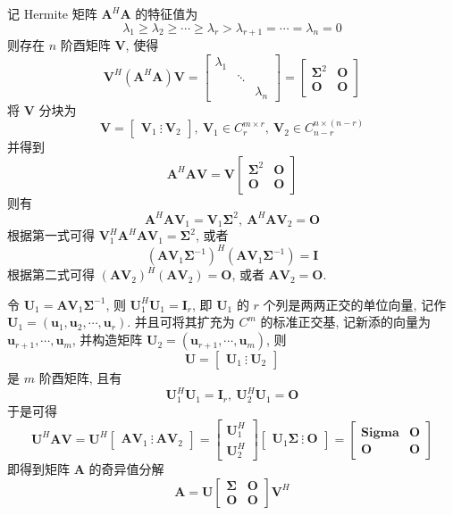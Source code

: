 \par 记 Hermite 矩阵 $\bm{A}^H\bm{A}$ 的特征值为
$$
    \lambda_1 \geqslant \lambda_2 \geqslant \cdots \geqslant \lambda_r > \lambda_{r + 1} = \cdots = \lambda_n = 0
$$
则存在 $n$ 阶酉矩阵 $\bm{V}$, 使得
$$
    \bm{V}^H(\bm{A}^H\bm{A})\bm{V} = \begin{bmatrix}
        \lambda_1 &        &           \\
                  & \ddots &           \\
                  &        & \lambda_n
    \end{bmatrix} = \begin{bmatrix}
        \bm{\Sigma}^2 & \bm{O} \\
        \bm{O}        & \bm{O}
    \end{bmatrix}
$$
将 $\bm{V}$ 分块为
$$
    \bm{V} = \begin{bmatrix}
        \bm{V}_1 \ \vdots \ \bm{V}_2
    \end{bmatrix},\ \bm{V}_1 \in C^{m\times r}_r,\ \bm{V}_2 \in C^{n\times(n - r)}_{n-r}
$$
并得到
$$
    \bm{A}^H\bm{AV} = \bm{V}\begin{bmatrix}
        \bm{\Sigma}^2 & \bm{O} \\
        \bm{O}        & \bm{O}
    \end{bmatrix}
$$
则有
$$
    \bm{A}^H\bm{AV}_1 = \bm{V}_1\bm{\Sigma}^2,\ \bm{A}^H\bm{AV}_2 = \bm{O}
$$
根据第一式可得 $\bm{V}_1^H\bm{A}^H\bm{AV}_1 = \bm{\Sigma}^2$, 或者
$$
    (\bm{AV}_1\bm{\Sigma}^{-1})^H(\bm{AV}_1\bm{\Sigma}^{-1}) = \bm{I}
$$
根据第二式可得 $(\bm{AV}_2)^H(\bm{AV}_2) = \bm{O}$, 或者 $\bm{AV}_2 = \bm{O}$.
\par 令 $\bm{U}_1 = \bm{AV}_1\bm{\Sigma}^{-1}$, 则 $\bm{U}_1^H\bm{U}_1 = \bm{I}_r$, 即 $\bm{U}_1$ 的 $r$ 个列是两两正交的单位向量, 记作
$\bm{U}_1 = (\bm{u}_1, \bm{u}_2, \cdots, \bm{u}_r)$. 并且可将其扩充为 $C^m$ 的标准正交基, 记新添的向量为 $\bm{u}_{r + 1}, \cdots, \bm{u}_m$,
并构造矩阵 $\bm{U}_2 = (\bm{u}_{r + 1}, \cdots, \bm{u}_m)$, 则
$$
    \bm{U} = \begin{bmatrix}
        \bm{U}_1 \ \vdots \ \bm{U}_2
    \end{bmatrix}
$$
是 $m$ 阶酉矩阵, 且有
$$
    \bm{U}_1^H\bm{U}_1 = \bm{I}_r,\ \bm{U}_2^H\bm{U}_1 = \bm{O}
$$
于是可得
$$
    \bm{U}^H\bm{AV} = \bm{U}^H\begin{bmatrix}
        \bm{AV}_1 \ \vdots \ \bm{AV}_2
    \end{bmatrix} = \begin{bmatrix}
        \bm{U}_1^H \\
        \bm{U}_2^H
    \end{bmatrix} \begin{bmatrix}
        \bm{U}_1\bm{\Sigma} \ \vdots \ \bm{O}
    \end{bmatrix} = \begin{bmatrix}
        \bm{Sigma} & \bm{O} \\
        \bm{O}     & \bm{O}
    \end{bmatrix}
$$
即得到矩阵 $\bm{A}$ 的奇异值分解
$$
    \bm{A} = \bm{U} \begin{bmatrix}
        \bm{\Sigma} & \bm{O} \\
        \bm{O}      & \bm{O}
    \end{bmatrix} \bm{V}^H
$$

